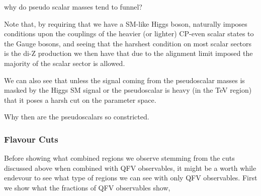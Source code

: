 { \color{red} why do pseudo scalar masses tend to funnel? } 

Note that, by requiring that we have a SM-like Higgs boson, naturally imposes conditions upon the couplings of the heavier (or lighter) CP-even scalar states to the Gauge bosons, and seeing that the harshest condition on most scalar sectors is the di-Z production we then have that due to the alignment limit imposed the majority of the scalar sector is allowed. 

We can also see that unless the signal coming from the pseudoscalar masses is masked by the Higgs SM signal or the pseudoscalar is heavy (in the TeV region) that it poses a harsh cut on the parameter space.

 { \color{red} Why then are the pseudoscalars so constricted. }   

\subsubsection{Flavour Cuts }


Before showing what combined regions we observe stemming from the cuts discussed above when combined with QFV observables, it might be a worth while endevour to see what type of regions we can see with only QFV observables. 
%
First we show what the fractions of QFV observables show,    

